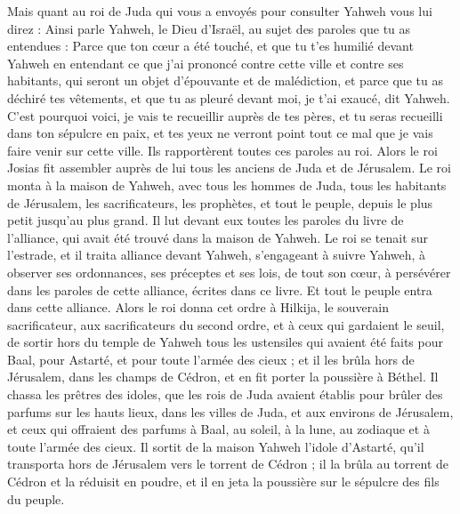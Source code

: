\begin{multicols}{2}
Mais quant au roi de Juda qui vous a envoyés pour consulter Yahweh vous lui direz : Ainsi parle Yahweh, le Dieu d’Israël, au sujet des paroles que tu as entendues :
Parce que ton cœur a été touché, et que tu t’es humilié devant Yahweh en entendant ce que j’ai prononcé contre cette ville et contre ses habitants, qui seront un objet d’épouvante et de malédiction, et parce que tu as déchiré tes vêtements, et que tu as pleuré devant moi, je t’ai exaucé, dit Yahweh.
C’est pourquoi voici, je vais te recueillir auprès de tes pères, et tu seras recueilli dans ton sépulcre en paix, et tes yeux ne verront point tout ce mal que je vais faire venir sur cette ville. Ils rapportèrent toutes ces paroles au roi.
\VerseOne{}Alors le roi Josias fit assembler auprès de lui tous les anciens de Juda et de Jérusalem.
Le roi monta à la maison de Yahweh, avec tous les hommes de Juda, tous les habitants de Jérusalem, les sacrificateurs, les prophètes, et tout le peuple, depuis le plus petit jusqu’au plus grand. Il lut devant eux toutes les paroles du livre de l’alliance, qui avait été trouvé dans la maison de Yahweh.
Le roi se tenait sur l’estrade, et il traita alliance devant Yahweh, s’engageant à suivre Yahweh, à observer ses ordonnances, ses préceptes et ses lois, de tout son cœur, à persévérer dans les paroles de cette alliance, écrites dans ce livre. Et tout le peuple entra dans cette alliance.
Alors le roi donna cet ordre à Hilkija, le souverain sacrificateur, aux sacrificateurs du second ordre, et à ceux qui gardaient le seuil, de sortir hors du temple de Yahweh tous les ustensiles qui avaient été faits pour Baal, pour Astarté, et pour toute l’armée des cieux ; et il les brûla hors de Jérusalem, dans les champs de Cédron, et en fit porter la poussière à Béthel.
Il chassa les prêtres des idoles, que les rois de Juda avaient établis pour brûler des parfums sur les hauts lieux, dans les villes de Juda, et aux environs de Jérusalem, et ceux qui offraient des parfums à Baal, au soleil, à la lune, au zodiaque et à toute l’armée des cieux.
Il sortit de la maison Yahweh l’idole d’Astarté, qu’il transporta hors de Jérusalem vers le torrent de Cédron ; il la brûla au torrent de Cédron et la réduisit en poudre, et il en jeta la poussière sur le sépulcre des fils du peuple.

\end{multicols}
